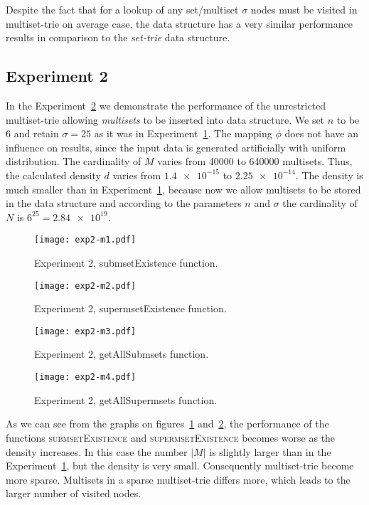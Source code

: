 Despite the fact that for a lookup of any set/multiset $\sigma$ nodes must be visited 
in multiset-trie on average case, the data structure has a very similar performance 
results in comparison to the \emph{set-trie} data structure.

\subsection{Experiment 2} \label{s:exp2}
In the Experiment~\hyperref[s:exp2]{2} we demonstrate the performance of 
the unrestricted multiset-trie allowing \emph{multisets} to be inserted into data structure. 
We set $n$ to be 6 and retain $\sigma = 25$ as it was in Experiment~\hyperref[s:exp1]{1}. 
The mapping $\phi$ does not have an influence on results, since the input 
data is generated artificially with uniform distribution. The cardinality of $M$ 
varies from 40000 to 640000 multisets. Thus, the calculated density $d$ varies 
from $\num{1.4e-15}$ to $\num{2.25e-14}.$ The density is much smaller than 
in Experiment~\hyperref[s:exp1]{1}, because now we allow multisets to be stored 
in the data structure and according to the parameters $n$ and $\sigma$ the 
cardinality of $N$ is $6^{25} = \num{2.84e19}.$

\begin{figure}
\center
\texttt{[image: exp2-m1.pdf]}
\caption{Experiment 2, submsetExistence function.}
\label{fig:e2m1}
\end{figure}

\begin{figure}
\center
\texttt{[image: exp2-m2.pdf]}
\caption{Experiment 2, supermsetExistence function.}
\label{fig:e2m2}
\end{figure}

\begin{figure}
\center
\texttt{[image: exp2-m3.pdf]}
\caption{Experiment 2, getAllSubmsets function.}
\label{fig:e2m3}
\end{figure}

\begin{figure}
\center
\texttt{[image: exp2-m4.pdf]}
\caption{Experiment 2, getAllSupermsets function.}
\label{fig:e2m4}
\end{figure}

As we can see from the graphs on figures~\ref{fig:e2m1} and~\ref{fig:e2m2}, 
the performance of the functions \textsc{submsetExistence} and 
\textsc{supermsetExistence} becomes worse as the density increases. 
In this case the number $|M|$ is slightly larger than in the 
Experiment~\hyperref[s:exp1]{1}, but the density is very small. Consequently 
multiset-trie become more sparse. Multisets in a sparse multiset-trie differs more, 
which leads to the larger number of visited nodes. 

